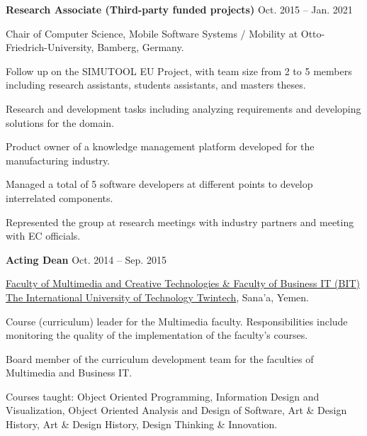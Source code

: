 \documentclass[10pt]{article}
\begin{document}
\textbf{Research Associate (Third-party funded projects)} \hfill{Oct. 2015 -- Jan. 2021}
\begin{outerlist}
	\item[] Chair of Computer Science, Mobile Software Systems / Mobility at Otto-Friedrich-University, Bamberg, Germany.
	\begin{innerlist}
		\item Follow up on the SIMUTOOL EU Project, with team size from 2 to 5 members including research assistants, students assistants, and masters theses.
		\item Research and development tasks including analyzing requirements and developing solutions for the domain.
		\item Product owner of a knowledge management platform developed for the manufacturing industry.
		\item Managed a total of 5 software developers at different points to develop interrelated components.
		\item Represented the group at research meetings with industry partners and meeting with EC officials.\\
	\end{innerlist}
\end{outerlist}



\textbf{Acting Dean} \hfill{Oct. 2014 -- Sep. 2015}
\begin{outerlist}
    \item[] \href{http://iutt.edu.ye/}{Faculty of Multimedia and Creative Technologies \& Faculty of Business IT (BIT) The International University of Technology Twintech}, Sana'a, Yemen.
    \begin{innerlist}
       \item Course (curriculum) leader for the Multimedia faculty. Responsibilities include monitoring the quality of the implementation of the faculty's courses.
       \item Board member of the curriculum development team for the faculties of Multimedia and Business IT.
       \item Courses taught: Object Oriented Programming, Information Design and Visualization, Object Oriented Analysis and Design of Software, Art \& Design History, Art \& Design History, Design Thinking \& Innovation.\\
    \end{innerlist}
\end{outerlist}
\end{document}
